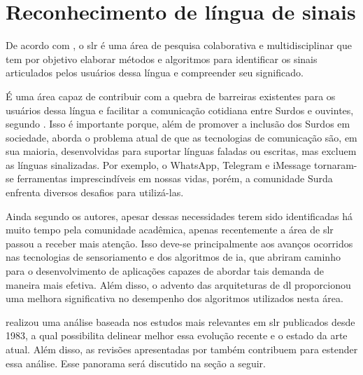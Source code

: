 \section{Reconhecimento de língua de sinais}
\label{sec:slr}

De acordo com , o \acrfull{slr} é uma área de pesquisa colaborativa e multidisciplinar que tem por objetivo elaborar métodos e algoritmos para identificar os sinais articulados pelos usuários dessa língua e compreender seu significado.

É uma área capaz de contribuir com a quebra de barreiras existentes para os usuários dessa língua e facilitar a comunicação cotidiana entre Surdos e ouvintes, segundo .
Isso é importante porque, além de promover a inclusão dos Surdos em sociedade, aborda o problema atual de que as tecnologias de comunicação são, em sua maioria, desenvolvidas para suportar línguas faladas ou escritas, mas excluem as línguas sinalizadas. Por exemplo, o WhatsApp, Telegram e iMessage tornaram-se ferramentas imprescindíveis em nossas vidas, porém, a comunidade Surda enfrenta diversos desafios para utilizá-las.

Ainda segundo os autores, apesar dessas necessidades terem sido identificadas há muito tempo pela comunidade acadêmica, apenas recentemente a área de \acrshort{slr} passou a receber mais atenção.
Isso deve-se principalmente aos avanços ocorridos nas tecnologias de sensoriamento e dos algoritmos de \acrshort{ia}, que abriram caminho para o desenvolvimento de aplicações capazes de abordar tais demanda de maneira mais efetiva. 
Além disso, o advento das arquiteturas de \acrshort{dl} proporcionou uma melhora significativa no desempenho dos algoritmos utilizados nesta área.

 realizou uma análise baseada nos estudos mais relevantes em \acrshort{slr} publicados desde 1983, a qual possibilita delinear melhor essa evolução recente e o estado da arte atual.
Além disso, as revisões apresentadas por  também contribuem para estender essa análise. Esse panorama será discutido na seção a seguir.

